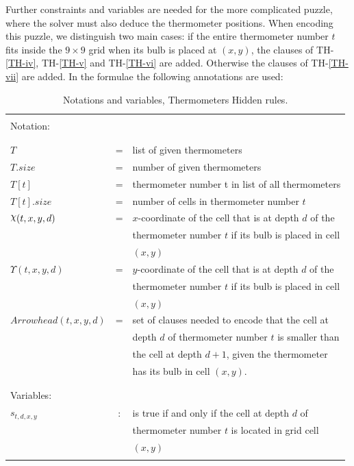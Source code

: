 Further constraints and variables are needed for the more complicated puzzle, where the solver must also deduce the thermometer positions.  
When encoding this puzzle, we distinguish two main cases: if the entire thermometer number $t$ fits inside the $9\times9$ grid when its bulb is placed at $(x,y)$, the clauses of TH-\ref{TH-iv}, TH-\ref{TH-v} and TH-\ref{TH-vi} are added. Otherwise the clauses of TH-\ref{TH-vii} are added.
In the formulae the following annotations are used:

\begin{table}[!ht]
    \centering
    \begin{tabular}{l c l}
    \hline
    \\
    Notation: &&\\
    \\
    \hline
    \\
    $T$                     &= &list of given thermometers\\
    $T.size$                &= &number of given thermometers\\
    $T[t]$                  &= &thermometer number t in list of all thermometers\\
    $T[t].size$             &= &number of cells in thermometer number $t$\\
    $\rchi(t,x,y,d)$           &= &$x$-coordinate of the cell that is at depth $d$ of the\\
                            &  &thermometer number $t$ if its bulb is placed in cell\\
                            &  &$(x,y)$\\
    $\Upsilon(t,x,y,d)$           &= &$y$-coordinate of the cell that is at depth $d$ of the\\
                            &  &thermometer number $t$ if its bulb is placed in cell\\
                            &  &$(x,y)$\\
    $Arrowhead(t,x,y,d)$    &= &set of clauses needed to encode that the cell at\\
                            &  &depth $d$ of thermometer number $t$ is smaller than\\
                            &  &the cell at depth $d+1$, given the thermometer\\
                            &  &has its bulb in cell $(x,y)$.\\
    \\
    \hline
    \\
    Variables:&&\\
    $s_{t,d,x,y}$           &: &is true if and only if the cell at depth $d$ of\\
                            &  &thermometer number $t$ is located in grid cell\\
                            &  &$(x,y)$\\
    \\
    \hline
\end{tabular}
    \caption{Notations and variables, Thermometers Hidden rules.}
    \label{notation:ThermometersHidden}
\end{table}





